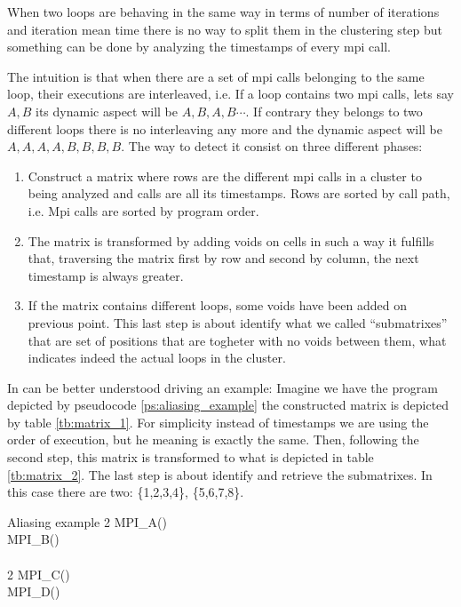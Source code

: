 When two loops are behaving in the same way in terms of number of iterations and
iteration mean time there is no way to split them in the clustering step but
something can be done by analyzing the timestamps of every mpi call.

The intuition is that when there are a set of mpi calls belonging to the same
loop, their executions are interleaved, i.e. If a loop contains two mpi calls,
lets say $A,B$ its dynamic aspect will be $A,B,A,B\cdots$. If contrary they
belongs to two different loops there is no interleaving any more and the dynamic
aspect will be $A,A,A,A,B,B,B,B$. The way to detect it consist on three
different phases:
\begin{enumerate}[label=\roman*)]
  \item Construct a matrix where rows are the different mpi calls in a cluster
    to being analyzed and calls are all its timestamps. Rows are sorted by call
    path, i.e. Mpi calls are sorted by program order.
  \item The matrix is transformed by adding voids on cells in such a way it
    fulfills that, traversing the matrix first by row and second by column, the
    next timestamp is always greater.
  \item If the matrix contains different loops, some voids have been added on
    previous point. This last step is about identify what we called
    ``submatrixes'' that are set of positions that are togheter with no voids
    between them, what indicates indeed the actual loops in the cluster.
\end{enumerate}

In can be better understood driving an example: Imagine we have the program
depicted by pseudocode \ref{ps:aliasing_example} the constructed matrix is
depicted by table \ref{tb:matrix_1}. For simplicity instead of timestamps we are
using the order of execution, but he meaning is exactly the same. Then,
following the second step, this matrix is transformed to what is depicted in
table \ref{tb:matrix_2}. The last step is about identify and retrieve the
submatrixes. In this case there are two: \{1,2,3,4\},
\{5,6,7,8\}.

\begin{pseudocode}{Aliasing example}{ }
    \label{ps:aliasing_example}
          2 \DO
        \BEGIN
            MPI\_A() \\
            MPI\_B() \\
        \END \\
          2 \DO
        \BEGIN
            MPI\_C() \\
            MPI\_D() \\
        \END\\
\end{pseudocode}

